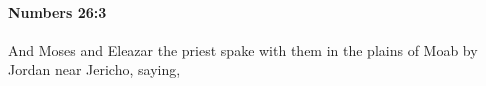 
		\paragraph{Numbers 26:3} %
			\label{NUMBERS-26-3}

			And Moses and Eleazar the priest spake with them in the plains of Moab by Jordan near Jericho, saying,


